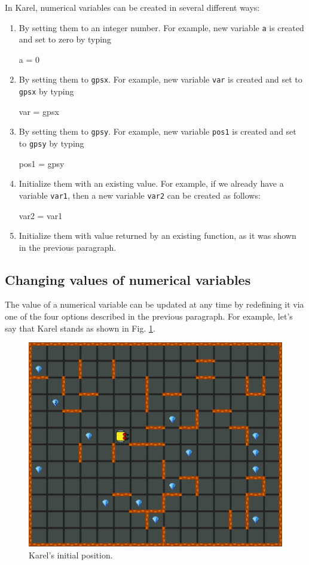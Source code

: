 In Karel, numerical variables can be created in several different ways: 
\begin{enumerate}
\item By setting them to an integer number. For example, new variable {\tt a} is created and set to zero by typing 
\begin{bluecode}
a = 0
\end{bluecode}
\item By setting them to {\tt gpsx}. For example, new variable {\tt var} is created and set to {\tt gpsx} by typing
\begin{bluecode}
var = gpsx
\end{bluecode}
\item By setting them to {\tt gpsy}. For example, new variable {\tt pos1} is created and set to {\tt gpsy} by typing
\begin{bluecode}
pos1 = gpsy
\end{bluecode}
\item Initialize them with an existing value. For example, if we already have a variable {\tt var1}, then a new variable 
{\tt var2} can be created as follows:
\begin{bluecode}
var2 = var1
\end{bluecode}
\item Initialize them with value returned by an existing function, as it was shown in the previous 
paragraph. 
\end{enumerate}

\subsection{Changing values of numerical variables}

The value of a numerical variable can be updated at any time by redefining it via 
one of the four options described in the previous paragraph. For example, let's say that 
Karel stands as shown in Fig. \ref{fig:var1}.
\begin{figure}[!ht]
\begin{center}
\includegraphics[height=0.4\textwidth]{imgk/variables1.png}
\end{center}
\vspace{-4mm}
\caption{Karel's initial position.}
\label{fig:var1}
\end{figure}

